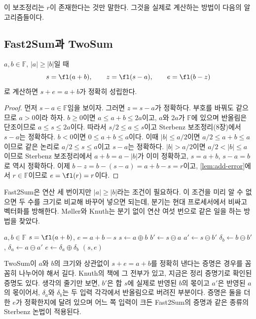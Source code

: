 이 보조정리는 $r$이 존재한다는 것만 말한다. 그것을 실제로 계산하는 방법이 다음의 알고리즘들이다.

\subsection{Fast2Sum과 TwoSum}

\begin{theorem}
\label{thm:fast2sum}
$a,b\in\mathbb F$, $|a|\ge|b|$일 때
\[
s=\fl(a+b),\qquad z=\fl(s-a),\qquad e=\fl(b-z)
\]
로 계산하면 $s+e=a+b$가 정확히 성립한다.
\end{theorem}

\begin{proof}
먼저 $s-a\in\mathbb F$임을 보이자. 그러면 $z=s-a$가 정확하다. 부호를 바꿔도 같으므로 $a>0$이라 하자. $b\ge0$이면 $a\le a+b\le2a$이고, $a$와 $2a$가 $\mathbb F$에 있으며 반올림은 단조이므로 $a\le s\le2a$이다. 따라서 $s/2\le a\le s$이고 Sterbenz 보조정리(8장)에서 $s-a$는 정확하다. $b<0$이면 $0\le a+b\le a$이다. 이때 $|b|\le a/2$이면 $a/2\le a+b\le a$이므로 같은 논리로 $a/2\le s\le a$이고 $s-a$는 정확하다. $|b|>a/2$이면 $a/2<|b|\le a$이므로 Sterbenz 보조정리에서 $a+b=a-|b|$가 이미 정확하고, $s=a+b$, $s-a=b$로 역시 정확하다. 이제 $b-z=b-(s-a)=a+b-s=r$이고, \cref{lem:add-error}에서 $r\in\mathbb F$이므로 $e=\fl(r)=r$이다.
\end{proof}

Fast2Sum은 연산 세 번이지만 $|a|\ge|b|$라는 조건이 필요하다. 이 조건을 미리 알 수 없으면 두 수를 크기로 비교해 바꾸어 넣으면 되는데, 분기는 현대 프로세서에서 비싸고 벡터화를 방해한다. Møller와 Knuth는 분기 없이 연산 여섯 번으로 같은 일을 하는 방법을 찾았다\cite{moller1965,knuth1997taocp2}.

\begin{algorithm}[t]
\begin{algorithmic}[1]
\Require $a,b\in\mathbb F$
\Ensure $s=\fl(a+b)$, $e=a+b-s$
\State $s\gets a\oplus b$
\State $b'\gets s\ominus a$ 
\State $a'\gets s\ominus b'$ 
\State $\delta_b\gets b\ominus b'$, $\delta_a\gets a\ominus a'$
\State $e\gets\delta_a\oplus\delta_b$
\State \Return $(s,e)$
\end{algorithmic}
\caption{TwoSum}
\label{alg:twosum}
\end{algorithm}

TwoSum이 $a$와 $b$의 크기와 상관없이 $s+e=a+b$를 정확히 낸다는 증명은 경우를 꼼꼼히 나누어야 해서 길다. Knuth의 책에 그 전부가 있고\cite{knuth1997taocp2}, 지금은 정리 증명기로 확인된 증명도 있다. 생각의 줄기만 보면, $b'$은 합 $s$에 실제로 반영된 $b$의 몫이고 $a'$은 반영된 $a$의 몫이어서, $\delta_a$와 $\delta_b$는 두 입력 각각에서 반올림으로 버려진 부분이다. 증명은 둘을 더한 $e$가 정확한지에 달려 있으며 어느 쪽 입력이 크든 Fast2Sum의 증명과 같은 종류의 Sterbenz 논법이 적용된다.

